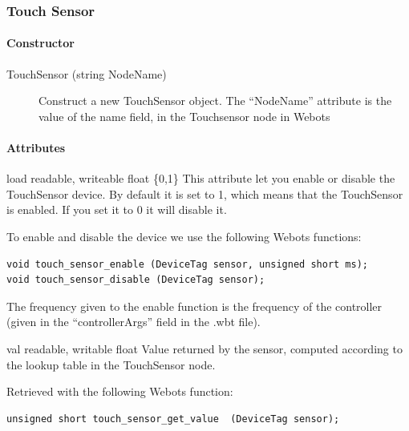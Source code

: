 \subsubsection{Touch Sensor}
\label{webots.uobjects.robotdevices.touchsensor}%

\paragraph{Constructor}
\label{webots.uobjects.robotdevices.touchsensor.constructor}%

\noindent
\begin{description}
\item[{TouchSensor (string NodeName)}]            Construct a new TouchSensor object. The ``NodeName'' attribute is the value
          of the name field, in the Touchsensor node in Webots

\end{description}

\paragraph{Attributes}
\label{webots.uobjects.robotdevices.touchsensor.attributes}%

\noindent
\begin{itemize}
\begin{attribute}{load}
  {readable, writeable}
  {float}
  {\{0,1\}}
  This attribute let you enable or disable the
  TouchSensor device.  By default it is set to 1, which means that the
  TouchSensor is enabled. If you set it to 0 it will disable it.


  To enable and disable the device we use the following Webots
  functions:


\begin{lstlisting}
void touch_sensor_enable (DeviceTag sensor, unsigned short ms);
void touch_sensor_disable (DeviceTag sensor);
\end{lstlisting}

          The frequency given to the enable function is the frequency of the
          \urbi controller (given in the ``controllerArgs'' field in the .wbt file).
\end{attribute}

\begin{attribute}{val}
  {readable, writable}
  {float}
  {}
  Value returned by the sensor, computed according to the
  lookup table in the TouchSensor node.


          Retrieved with the following Webots function:


\begin{lstlisting}
unsigned short touch_sensor_get_value  (DeviceTag sensor);
\end{lstlisting}
\end{attribute}

\end{itemize}


